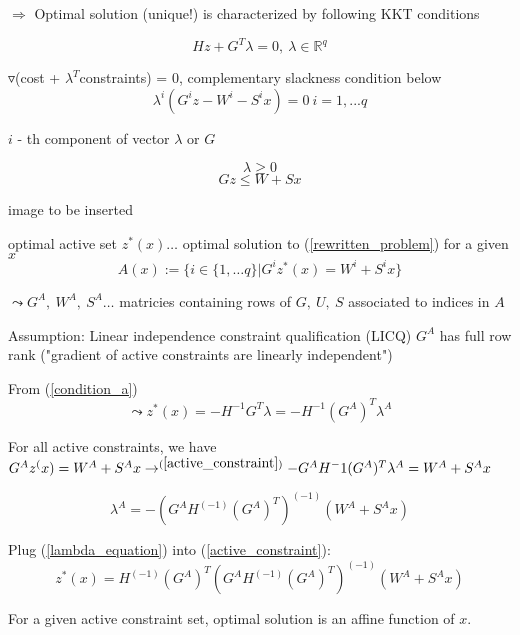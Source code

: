 $\Rightarrow$ Optimal solution (unique!) is characterized by following KKT conditions

\begin{equation}\label{condition_a}
Hz + G^T\lambda = 0, \ \lambda \in \mathbb{R}^q
\end{equation}

$\triangledown$(cost + $\lambda^T$constraints) = 0, complementary slackness condition below
\begin{equation}\label{condition_b}
\lambda^i(G^iz - W^i-S^ix) = 0 \ i=1, ...q
\end{equation}

$i$ - th component of vector $\lambda$ or $G$

\begin{equation}\label{condition_c}
\lambda \geq 0
\end{equation}
\begin{equation}\label{condition_d}
Gz \leq W + Sx
\end{equation}

image to be inserted

\begin{Definition}
optimal active set $z^*(x) \dots$ optimal solution to (\ref{rewritten_problem}) for a given $x$
\begin{equation*}
A(x) := \{ i \in \{1, \dots q\} | G^iz^*(x) = W^i + S^ix \}
\end{equation*}

$\leadsto G^A, \ W^A, \ S^A \dots$ matricies containing rows of $G, \ U, \ S$ associated to indices in $A$ 
\end{Definition}

Assumption: Linear independence constraint qualification (LICQ) $G^A$ has full row rank ("gradient of active constraints are linearly independent")

From (\ref{condition_a}) 
\begin{equation}\label{active_constraint}
\leadsto z^*(x) = -H^{-1}G^T\lambda = -H^{-1}(G^A)^T\lambda^A
\end{equation}

For all active constraints, we have $G^Az^(x) = W^A + S^Ax \to^{(\ref{active_constraint})} - G^AH^-1(G^A)^T\lambda^A = W^A+S^Ax$

\begin{equation}\label{lambda_equation}
\lambda^A = - (G^AH^(-1)(G^A)^T)^(-1)(W^A+S^Ax)
\end{equation} 

Plug (\ref{lambda_equation}) into (\ref{active_constraint}):
\begin{equation}\label{optimal_z}
z^*(x) = H^(-1)(G^A)^T(G^AH^(-1)(G^A)^T)^(-1)(W^A + S^Ax)
\end{equation}

For a given active constraint set, optimal solution is an affine function of $x$.

